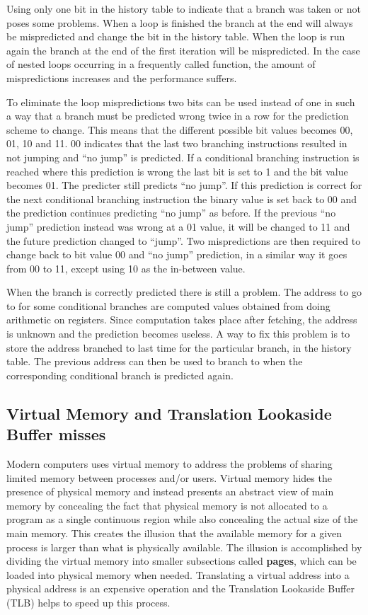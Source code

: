 Using only one bit in the history table to indicate that a branch was taken or not poses some problems.
When a loop is finished the branch at the end will always be mispredicted and change the bit in the history table.
When the loop is run again the branch at the end of the first iteration will be mispredicted.
In the case of nested loops occurring in a frequently called function, the amount of mispredictions increases and the performance suffers.

To eliminate the loop mispredictions two bits can be used instead of one in such a way that a branch must be predicted wrong twice in a row for the prediction scheme to change.
This means that the different possible bit values becomes
00, 01, 10 and 11.
00 indicates that the last two branching instructions resulted in not jumping and “no jump” is predicted. If a conditional branching instruction is reached where this prediction is wrong the last bit is set to 1 and the bit value becomes 01. The predicter still predicts “no jump”.
If this prediction is correct for the next conditional branching instruction the binary value is set back to 00 and the prediction continues predicting “no jump” as before.
If the previous “no jump” prediction instead was wrong at a 01 value, it will be changed to 11 and the future prediction changed to “jump”.
Two mispredictions are then required to change back to bit value 00 and “no jump” prediction, in a similar way it goes from 00 to 11, except using 10 as the in-between value.

When the branch is correctly predicted there is still a problem.
The address to go to for some conditional branches are computed values obtained from doing arithmetic on registers. 
Since computation takes place after fetching, the address is unknown and the prediction becomes useless. 
A way to fix this problem is to store the address branched to last time for the particular branch, in the history table.
The previous address can then be used to branch to when the corresponding conditional branch is predicted again.


\subsection{Virtual Memory and Translation Lookaside Buffer misses}
Modern computers uses virtual memory to address the problems of sharing limited memory between processes and/or users.
Virtual memory hides the presence of physical memory and instead presents an abstract view of main memory by concealing the fact that physical memory is not allocated to a program as a single continuous region while also concealing the actual size of the main memory.
This creates the illusion that the available memory for a given process is larger than what is physically available.
The illusion is accomplished by dividing the virtual memory into smaller subsections called \textbf{pages}, which can be loaded into physical memory when needed.
Translating a virtual address into a physical address is an expensive operation and the Translation Lookaside Buffer (TLB) helps to speed up this process.

